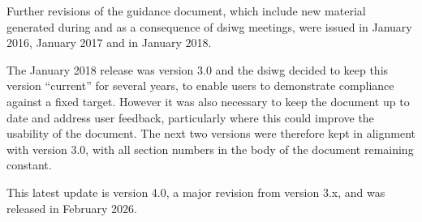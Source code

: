 Further revisions of the guidance document, which include new material generated during and as a consequence of \gls{dsiwg} meetings, were issued in January 2016, January 2017 and in January 2018.

The January 2018 release was version 3.0 and the \gls{dsiwg} decided to keep this version ``current'' for several years, to enable users to demonstrate compliance against a fixed target. However it was also necessary to keep the document up to date and address user feedback, particularly where this could improve the usability of the document. The next two versions were therefore kept in alignment with version 3.0, with all section numbers in the body of the document remaining constant.

This latest update is version 4.0, a major revision from version 3.x, and was released in February 2026.
